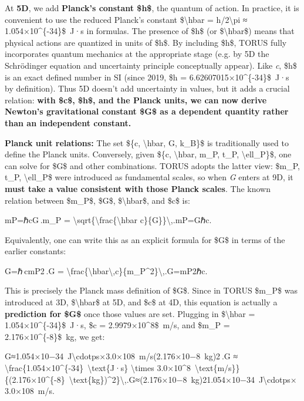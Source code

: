 \documentclass[]{article}
\begin{document}
At \textbf{5D}, we add \textbf{Planck's constant \$h\$}, the quantum of
action. In practice, it is convenient to use the reduced Planck's
constant \$\textbackslash{}hbar = h/2\textbackslash{}pi ≈
1.054×10\^{}\{-34\}\$~J·s in formulas. The presence of \$h\$ (or
\$\textbackslash{}hbar\$) means that physical actions are quantized in
units of \$h\$. By including \$h\$, TORUS fully incorporates quantum
mechanics at the appropriate stage (e.g. by 5D the Schrödinger equation
and uncertainty principle conceptually appear). Like \emph{c}, \$h\$ is
an exact defined number in SI (since 2019, \$h =
6.62607015×10\^{}\{-34\}\$~J·s by definition). Thus 5D doesn't add
uncertainty in values, but it adds a crucial relation: \textbf{with
\$c\$, \$h\$, and the Planck units, we can now derive Newton's
gravitational constant \$G\$ as a dependent quantity rather than an
independent constant.}

\textbf{Planck unit relations:} The set \$\{c, \textbackslash{}hbar, G,
k\_B\}\$ is traditionally used to define the Planck units. Conversely,
given \$\{c, \textbackslash{}hbar, m\_P, t\_P,
\textbackslash{}ell\_P\}\$, one can solve for \$G\$ and other
combinations. TORUS adopts the latter view: \$m\_P, t\_P,
\textbackslash{}ell\_P\$ were introduced as fundamental scales, so when
\emph{G} enters at 9D, it \textbf{must take a value consistent with
those Planck scales}. The known relation between \$m\_P\$, \$G\$,
\$\textbackslash{}hbar\$, and \$c\$ is:

mP=ℏcG .m\_P =
\textbackslash{}sqrt\{\textbackslash{}frac\{\textbackslash{}hbar
c\}\{G\}\}\textbackslash{},.mP​=Gℏc​​.

Equivalently, one can write this as an explicit formula for \$G\$ in
terms of the earlier constants:

G=ℏ cmP2 .G =
\textbackslash{}frac\{\textbackslash{}hbar\textbackslash{},c\}\{m\_P\^{}2\}\textbackslash{},.G=mP2​ℏc​.

This is precisely the Planck mass definition of \$G\$​. Since in TORUS
\$m\_P\$ was introduced at 3D, \$\textbackslash{}hbar\$ at 5D, and \$c\$
at 4D, this equation is actually a \textbf{prediction for \$G\$} once
those values are set. Plugging in \$\textbackslash{}hbar =
1.054×10\^{}\{-34\}\$~J·s, \$c = 2.9979×10\^{}8\$~m/s, and \$m\_P =
2.176×10\^{}\{-8\}\$~kg, we get:

G≈1.054×10−34~J\textbackslash{}cdotps×3.0×108~m/s(2.176×10−8~kg)2 .G ≈
\textbackslash{}frac\{1.054×10\^{}\{-34\}~\textbackslash{}text\{J·s\}
\textbackslash{}times
3.0×10\^{}8~\textbackslash{}text\{m/s\}\}\{(2.176×10\^{}\{-8\}~\textbackslash{}text\{kg\})\^{}2\}\textbackslash{},.G≈(2.176×10−8~kg)21.054×10−34~J\textbackslash{}cdotps×3.0×108~m/s​.
\end{document}
